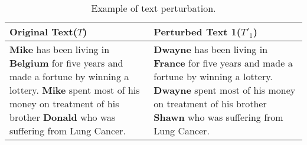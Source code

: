 \begin{table}[ht]
\centering
\small
\begin{tabular}{|p{3.5cm}|p{3.5cm}|}
\hline
Original Text($T$)  & Perturbed Text 1($T'_1$) \\
\hline
\textbf{Mike} has been living in \textbf{Belgium} for five years and made a fortune by winning a lottery. \textbf{Mike} spent most of his money on treatment of his brother \textbf{Donald} who was suffering from Lung Cancer. & \textbf{Dwayne} has been living in \textbf{France} for five years and made a fortune by winning a lottery. \textbf{Dwayne} spent most of his money on treatment of his brother \textbf{Shawn} who was suffering from Lung Cancer. \\
\hline
\end{tabular}
\caption{Example of text perturbation.}
\label{tab:perturbation_example}
\end{table}








